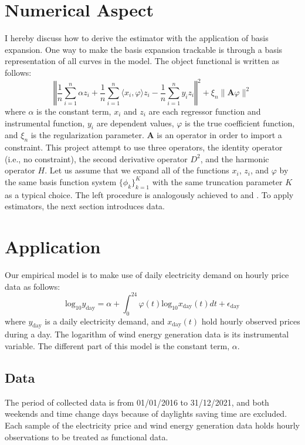 \documentclass[11pt, a4paper, leqno]{article}
\begin{document}
\section{Numerical Aspect}
I hereby discuss how to derive the estimator with the application of basis expansion. One way to make the basis expansion trackable is through a basis representation of all curves in the model. The object functional is written as follows:
\begin{equation*}
	\left\Vert \frac{1}{n}\sum_{i=1}^{n} \alpha z_i + \frac{1}{n}\sum_{i=1}^{n} \langle x_i, \varphi \rangle z_i - \frac{1}{n} \sum_{i=1}^{n} y_i z_i \right\Vert^2 + \xi_n \lVert \bm{A} \varphi \rVert^2
\end{equation*}
where $\alpha$ is the constant term, $x_i$ and $z_i$ are each regressor function and instrumental function, $y_i$ are dependent values, $\varphi$ is the true coefficient function, and $\xi_n$ is the regularization parameter. $\bm{A}$ is an operator in order to import a constraint. This project attempt to use three operators, the identity operator (i.e., no constraint), the second derivative operator $D^2$, and the harmonic operator $H$.
Let us assume that we expand all of the functions $x_i$, $z_i$, and $\varphi$ by the same basis function system $\{\phi_k\}_{k=1}^{K}$ with the same truncation parameter $K$ as a typical choice. The left procedure is analogously achieved to \citet{Ramsay.2005} and \citet{Goldsmith.2011}. To apply estimators, the next section introduces data.


\newpage

\section{Application}

Our empirical model is to make use of daily electricity demand on hourly price data as follows:
\begin{equation*}
	\text{log}_{10}y_{\text{day}} = \alpha + \int_{0}^{24}\varphi(t) \text{log}_{10}x_{\text{day}}(t) dt + \epsilon_{\text{day}}
\end{equation*}
where $y_{\text{day}}$ is a daily electricity demand, and $x_{\text{day}}(t)$ hold hourly observed prices during a day. The logarithm of wind energy generation data is its instrumental variable. The different part of this model is the constant term, $\alpha$.

\subsection{Data}
The period of collected data is from 01/01/2016 to 31/12/2021, and both weekends and time change days because of  daylights saving time are excluded. Each sample of the electricity price and wind energy generation data holds hourly observations to be treated as functional data.
\end{document}
